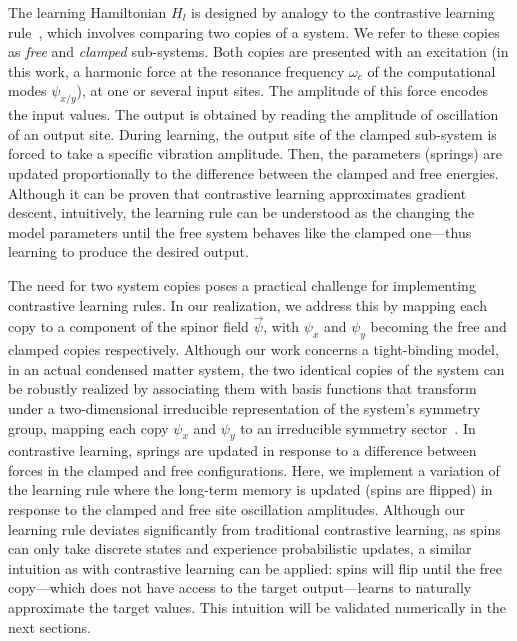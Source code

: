The learning Hamiltonian $H_l$ is designed by analogy to the contrastive learning rule~\cite{labDem}, which involves comparing two copies of a system. We refer to these copies as \emph{free} and \emph{clamped} sub-systems. Both copies are presented with an excitation (in this work, a harmonic force at the resonance frequency $\omega_c$ of the computational modes $\psi_{x/y}$), at one or several input sites. The amplitude of this force encodes the input values. The output is obtained by reading the amplitude of oscillation of an output site. During learning, the output site of the clamped sub-system is forced to take a specific vibration amplitude. Then, the parameters (springs) are updated proportionally to the difference between the clamped and free energies. Although it can be proven that contrastive learning approximates gradient descent, intuitively, the learning rule can be understood as the changing the model parameters until the free system behaves like the clamped one---thus learning to produce the desired output. 

The need for two system copies poses a practical challenge for implementing contrastive learning rules. In our realization, we address this by mapping each copy to a component of the spinor field $\vec{\psi}$, with $\psi_x$ and $\psi_y$ becoming the free and clamped copies respectively. Although our work concerns a tight-binding model, in an actual condensed matter system, the two identical copies of the system can be robustly realized by associating them with basis functions that transform under a two-dimensional irreducible representation of the system's symmetry group, mapping each copy $\psi_x$ and $\psi_y$ to an irreducible symmetry sector~\cite{peri2019axial}. In contrastive learning, springs are updated in response to a difference between forces in the clamped and free configurations. Here, we implement a variation of the learning rule where the long-term memory is updated (spins are flipped) in response to the clamped and free site oscillation amplitudes. Although our learning rule deviates significantly from traditional contrastive learning, as spins can only take discrete states and experience probabilistic updates, a similar intuition as with contrastive learning can be applied: spins will flip until the free copy---which does not have access to the target output---learns to naturally approximate the target values. This intuition will be validated numerically in the next sections.



